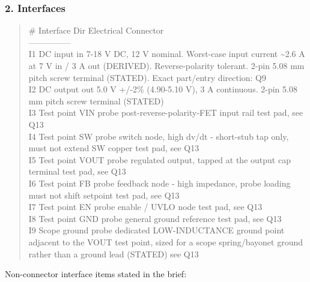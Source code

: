 \documentclass[11pt,a4paper]{article}
\begin{document}
\subsubsection*{2. Interfaces}
\begin{quote}\small\ttfamily\raggedright
\textbar{} \# \textbar{} Interface \textbar{} Dir \textbar{} Electrical \textbar{} Connector \textbar{}\\
\textbar{}---\textbar{}---\textbar{}---\textbar{}---\textbar{}---\textbar{}\\
\textbar{} I1 \textbar{} DC input \textbar{} in \textbar{} 7-18 V DC, 12 V nominal. Worst-case input current \textasciitilde{}2.6 A at 7 V in / 3 A out (DERIVED). Reverse-polarity tolerant. \textbar{} 2-pin 5.08 mm pitch screw terminal (STATED). Exact part/entry direction: Q9 \textbar{}\\
\textbar{} I2 \textbar{} DC output \textbar{} out \textbar{} 5.0 V +/-2\% (4.90-5.10 V), 3 A continuous. \textbar{} 2-pin 5.08 mm pitch screw terminal (STATED) \textbar{}\\
\textbar{} I3 \textbar{} Test point VIN \textbar{} probe \textbar{} post-reverse-polarity-FET input rail \textbar{} test pad, see Q13 \textbar{}\\
\textbar{} I4 \textbar{} Test point SW \textbar{} probe \textbar{} switch node, high dv/dt - short-stub tap only, must not extend SW copper \textbar{} test pad, see Q13 \textbar{}\\
\textbar{} I5 \textbar{} Test point VOUT \textbar{} probe \textbar{} regulated output, tapped at the output cap terminal \textbar{} test pad, see Q13 \textbar{}\\
\textbar{} I6 \textbar{} Test point FB \textbar{} probe \textbar{} feedback node - high impedance, probe loading must not shift setpoint \textbar{} test pad, see Q13 \textbar{}\\
\textbar{} I7 \textbar{} Test point EN \textbar{} probe \textbar{} enable / UVLO node \textbar{} test pad, see Q13 \textbar{}\\
\textbar{} I8 \textbar{} Test point GND \textbar{} probe \textbar{} general ground reference \textbar{} test pad, see Q13 \textbar{}\\
\textbar{} I9 \textbar{} Scope ground \textbar{} probe \textbar{} dedicated LOW-INDUCTANCE ground point adjacent to the VOUT test point, sized for a scope spring/bayonet ground rather than a ground lead (STATED) \textbar{} see Q13 \textbar{}
\end{quote}
Non-connector interface items stated in the brief:
\end{document}
